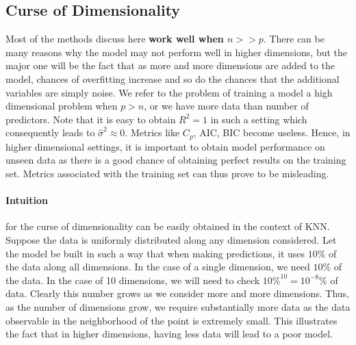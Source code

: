 \documentclass[11pt, a4paper]{article}
\begin{document}
    \subsection{Curse of Dimensionality}
    Most of the methods discuss here \textbf{work well when $n >> p$}. There can be many reasons why the model may not perform well in higher dimensions, but the major one will be the fact that as more and more dimensions are added to the model, chances of overfitting increase and so do the chances that the additional variables are simply noise.\newline
    We refer to the problem of training a model a high dimensional problem when $p > n$, or we have more data than number of predictors. Note that it is easy to obtain $R^{2} = 1$ in such a setting which consequently leads to $\hat{\sigma}^{2} \approx 0$. Metrics like $C_{p}$, AIC, BIC become useless.\newline
    Hence, in higher dimensional settings, it is important to obtain model performance on unseen data as there is a good chance of obtaining perfect results on the training set. Metrics associated with the training set can thus prove to be misleading.

    \paragraph{Intuition}
    for the curse of dimensionality can be easily obtained in the context of KNN.\newline
    Suppose the data is uniformly distributed along any dimension considered. Let the model be built in such a way that when making predictions, it uses $10\%$ of the data along all dimensions. \newline
    In the case of a single dimension, we need $10\%$ of the data. In the case of 10 dimensions, we will need to check $10\% ^{10} = 10^{-8}\%$ of data. Clearly this number grows as we consider more and more dimensions.\newline
    Thus, as the number of dimensions grow, we require substantially more data as the data observable in the neighborhood of the point is extremely small. This illustrates the fact that in higher dimensions, having less data will lead to a poor model.


    
\end{document}
